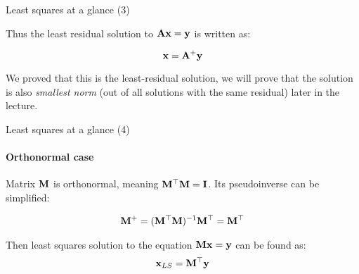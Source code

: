 \documentclass{beamer}
\begin{document}
\begin{frame}{Least squares at a glance (3)}
	\begin{flushleft}
		
		Thus the least residual solution to $\mathbf{A}\mathbf{x} = \mathbf{y}$ is written as:
		
		\begin{equation}
			\mathbf{x} = \mathbf{A}^+\mathbf{y}
		\end{equation}
		
		We proved that this is the least-residual solution, we will prove that the solution is also \emph{smallest norm} (out of all solutions with the same residual) later in the lecture.
		
	\end{flushleft}
\end{frame}




\begin{frame}{Least squares at a glance (4)}
 \framesubtitle{Orthonormal case}
	\begin{flushleft}
		
		Matrix $\mathbf{M}$ is orthonormal, meaning $\mathbf{M}^\top \mathbf{M} = \mathbf{I}$. Its  pseudoinverse can be simplified:
		
		\begin{align}
			\mathbf{M}^+ = (\mathbf{M}^\top\mathbf{M})^{-1} \mathbf{M}^\top = \mathbf{M}^\top
		\end{align}
	
		\bigskip
	
		Then least squares solution to the equation $\mathbf{M} \mathbf{x} = \mathbf{y}$ can be found as:
		\begin{align}
			\mathbf{x}_{LS} = \mathbf{M}^\top \mathbf{y}
		\end{align}
	
	
	\end{flushleft}
\end{frame}
\end{document}
